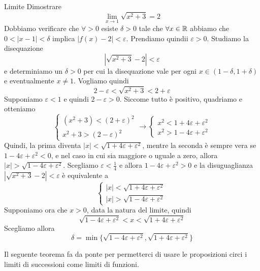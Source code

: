 \documentclass[a4paper]{article}
\begin{document}
\begin{radioactive}
\begin{snippetexample}{Limite}
    Dimostrare
    \[
        \lim_{x\to 1} \sqrt{x^2 + 3} = 2
    \]
    Dobbiamo verificare che \(\forall > 0\) esiste \(\delta>0\)
    tale che \(\forall x \in \mathbb{R}\) abbiamo che \(0<|x-1|<\delta\)
    implica \(|f(x) - 2| < \varepsilon\).
    Prendiamo quindii \(\varepsilon > 0\).
    Studiamo la disequazione
    \[
        |\sqrt{x^2 + 3} - 2| < \varepsilon
    \]
    e determiniamo un \(\delta > 0\) per cui la disequazione vale per ogni \(x \in (1-\delta, 1 + \delta)\)
    e eventualmente \(x \neq 1\).
    Vogliamo quindi
    \[
        2 - \varepsilon < \sqrt{x^2 + 3} < 2 + \varepsilon
    \]
    Supponiamo \(\varepsilon < 1\) e quindi \(2-\varepsilon>0\).
    Siccome tutto è positivo, quadriamo e otteniamo
    \[
        \begin{cases}
            (x^2 + 3) < {(2 + \varepsilon)}^2 \\
            x^2 + 3 > {(2 - \varepsilon)}^2
        \end{cases}
        \rightarrow
        \begin{cases}
            x^2 < 1 + 4\varepsilon + \varepsilon^2 \\
            x^2 > 1 - 4\varepsilon + \varepsilon^2
        \end{cases}
    \]
    Quindi, la prima diventa \(|x| < \sqrt{1 + 4\varepsilon + \varepsilon^2}\),
    mentre la seconda è sempre vera se \(1-4\varepsilon+\varepsilon^2 < 0\),
    e nel caso in cui sia maggiore o uguale a zero, allora \(|x|>\sqrt{1-4\varepsilon+\varepsilon^2}\).
    Scegliamo \(\varepsilon<\frac{1}{4}\) e allora \(1 - 4\varepsilon + \varepsilon^2 > 0\)
    e la disuguaglianza \(|\sqrt{x^2 +3} - 2| < \varepsilon\)
    è equivalente a \[
        \begin{cases}
            |x| < \sqrt{1 + 4\varepsilon + \varepsilon^2} \\
            |x| > \sqrt{1 - 4\varepsilon + \varepsilon^2}
        \end{cases}
    \] 
    Supponiamo ora che \(x>0\), data la natura del limite, quindi
    \[
        \sqrt{1 - 4\varepsilon + \varepsilon^2} < x < \sqrt{1 + 4\varepsilon + \varepsilon^2}
    \]
    Scegliamo allora
    \[
        \delta = \min\{\sqrt{1 - 4\varepsilon + \varepsilon^2}, \sqrt{1 + 4\varepsilon + \varepsilon^2}\}
    \]
\end{snippetexample}

Il seguente teorema fa da ponte per permetterci di usare le proposizioni circi i limiti di successioni
come limiti di funzioni.


\end{radioactive}
\end{document}
